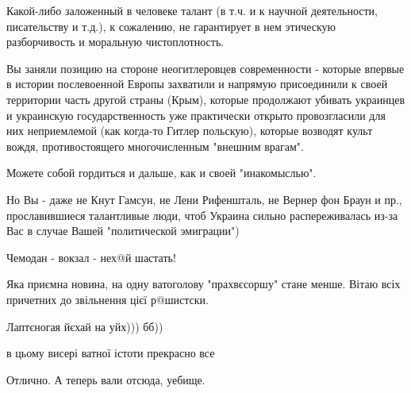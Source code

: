 \begin{itemize}
Какой-либо заложенный в человеке талант (в т.ч. и к научной деятельности,
писательству и т.д.), к сожалению, не гарантирует в нем этическую разборчивость
и моральную чистоплотность.

Вы заняли позицию на стороне неогитлеровцев современности - которые впервые в
истории послевоенной Европы захватили и напрямую присоединили к своей
территории часть другой страны (Крым), которые продолжают убивать украинцев и
украинскую государственность уже практически открыто провозгласили для них
неприемлемой (как когда-то Гитлер польскую), которые возводят культ вождя,
противостоящего многочисленным "внешним врагам".

Можете собой гордиться и дальше, как и своей "инакомыслью".

Но Вы - даже не Кнут Гамсун, не Лени Рифеншталь, не Вернер фон Браун и пр.,
прославившиеся талантливые люди, чтоб Украина сильно распереживалась из-за Вас
в случае Вашей "политической эмиграции")

 
Чемодан - вокзал - нех@й шастать!

 
Яка приємна новина, на одну ватоголову "прахвєсоршу" стане менше. Вітаю всіх причетних до звільнення цієї р@шистски.

 
Лаптєногая йєхай на уйх))) бб))

 
в цьому висері ватної істоти прекрасно все 🤗

 
Отлично. А теперь вали отсюда, уебище.


\end{itemize}
